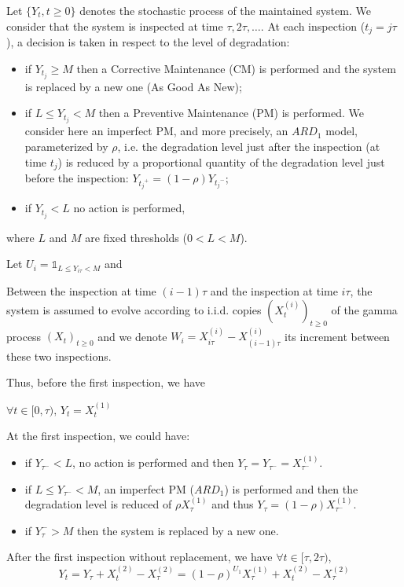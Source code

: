 \documentclass[review]{elsarticle}
\begin{document}
Let $\{Y_t,t\geq 0\}$ denotes the stochastic process of the maintained system. We consider that the system is inspected at time $\tau,2\tau,\ldots$. At each inspection ($t_j=j\tau$), a decision is taken in respect to the level of degradation:
\begin{itemize}
	\item if $Y_{t_j} \geq M$ then a Corrective Maintenance (CM) is performed and the system is replaced by a new one (As Good As New);
	\item if $L\leq Y_{t_j} < M$ then a Preventive Maintenance (PM) is performed. We consider here an imperfect PM, and more precisely, an $ARD_1$ model, parameterized by $\rho$, i.e. the degradation level just after the inspection (at time $t_j$) is reduced by a proportional quantity of the degradation level just before the inspection: $Y_{{t_j}^+} = (1-\rho)Y_{{t_j}^-}$;
	\item if $Y_{t_j} < L$ no action is performed,
\end{itemize}
where $L$ and $M$ are fixed thresholds ($0<L<M$).

Let $U_i = {\mathds 1}_{L \leq Y_{i \tau}< M} $ and 

Between the inspection at time $(i-1)\tau$ and the inspection at time $i\tau$, the system is assumed to evolve according to i.i.d. copies $(X_t^{(i)})_{t\geq0}$ of the gamma process $(X_t)_{t\geq0}$ and we denote $W_i = X_{i\tau}^{(i)}-X_{(i-1)\tau}^{(i)}$ its increment between these two inspections.

Thus, before the first inspection, we have

$\forall t\in[0,\tau),\, Y_t = X_t^{(1)}$

At the first inspection, we could have:
\begin{itemize}
	\item if $Y_{\tau^-} <L$, no action is performed and then $Y_{\tau} = Y_{\tau^-} = X_{\tau^-}^{(1)}$.
	\item if $L \leq Y_{\tau^-} <M$, an imperfect PM ($ARD_1$) is performed and then the degradation level is reduced of $\rho X_{\tau}^{(1)}$ and thus $Y_{\tau} = (1-\rho) X_{\tau^-}^{(1)}$.
	\item if $Y_\tau^->M$ then the system is replaced by a new one.
\end{itemize}

After the first inspection without replacement, we have $\forall t\in [\tau,2\tau)$, 
$$
Y_t = Y_\tau + X_t^{(2)} - X_\tau^{(2)} = (1-\rho)^{U_1} X_\tau^{(1)}+X_t^{(2)} - X_\tau^{(2)} 
$$
\end{document}
